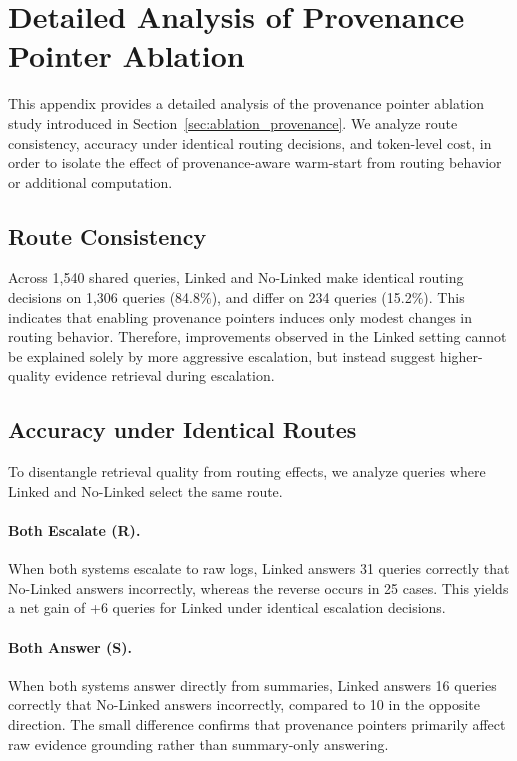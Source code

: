 \documentclass{article}
\theoremstyle{plain}
\theoremstyle{definition}
\theoremstyle{remark}
\begin{document}

\section{Detailed Analysis of Provenance Pointer Ablation}
\label{app:provenance}

This appendix provides a detailed analysis of the provenance pointer ablation study introduced in Section~\ref{sec:ablation_provenance}.
We analyze route consistency, accuracy under identical routing decisions, and token-level cost, in order to isolate the effect of provenance-aware warm-start from routing behavior or additional computation.

\subsection{Route Consistency}
\label{app:provenance_route}
Across 1,540 shared queries, Linked and No-Linked make identical routing decisions on 1,306 queries (84.8\%), and differ on 234 queries (15.2\%).
This indicates that enabling provenance pointers induces only modest changes in routing behavior.
Therefore, improvements observed in the Linked setting cannot be explained solely by more aggressive escalation, but instead suggest higher-quality evidence retrieval during escalation.

\subsection{Accuracy under Identical Routes}
\label{app:provenance_same_route}
To disentangle retrieval quality from routing effects, we analyze queries where Linked and No-Linked select the same route.

\paragraph{Both Escalate (R).}
When both systems escalate to raw logs, Linked answers 31 queries correctly that No-Linked answers incorrectly, whereas the reverse occurs in 25 cases.
This yields a net gain of +6 queries for Linked under identical escalation decisions.

\paragraph{Both Answer (S).}
When both systems answer directly from summaries, Linked answers 16 queries correctly that No-Linked answers incorrectly, compared to 10 in the opposite direction.
The small difference confirms that provenance pointers primarily affect raw evidence grounding rather than summary-only answering.
\end{document}
